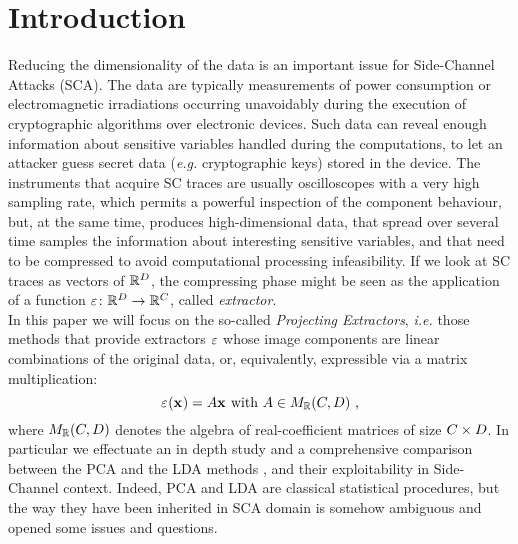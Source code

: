 \section{Introduction}
Reducing the dimensionality of the data is an important issue for Side-Channel Attacks (SCA). The data are typically measurements of power consumption or electromagnetic irradiations occurring unavoidably during the execution of cryptographic algorithms over electronic devices. Such data can reveal enough information about sensitive variables handled during the computations, to let an attacker guess secret data ({\em e.g.} cryptographic keys) stored in the device. The instruments that acquire SC traces are usually oscilloscopes with a very high sampling rate, which permits a powerful inspection of the component behaviour, but, at the same time, produces high-dimensional data, that spread over several time samples the information about interesting sensitive variables, and that need to be compressed to avoid computational processing infeasibility. If we look at SC traces as vectors of $\mathbb{R}^\traceLength$, the compressing phase might be seen as the application of a function $\extract\colon \mathbb{R}^\traceLength\rightarrow \mathbb{R}^\newTraceLength$, called {\em extractor}.\\

In this paper we will focus on the so-called {\em Projecting Extractors}, {\em i.e.} those methods that provide extractors $\extract$ whose image components are linear combinations of the original data, or, equivalently, expressible via a matrix multiplication:
\begin{equation}
\extractor{\sss[]{}} = A\sss[]{} \mbox{ with } A \in M_{\mathbb{R}}(\newTraceLength, \traceLength) \mbox{ ,}
\end{equation}
where $ M_{\mathbb{R}}(\newTraceLength, \traceLength)$ denotes the algebra of real-coefficient matrices of size $\newTraceLength \times \traceLength$.  In particular we effectuate an in depth study and a comprehensive comparison  between the PCA and the LDA methods \cite{fisher1938statistical,Fukunaga}, and their exploitability  in Side-Channel context.  Indeed, PCA and LDA are classical statistical procedures, but the way they have been inherited in SCA domain is somehow ambiguous and opened some issues and questions.\\

